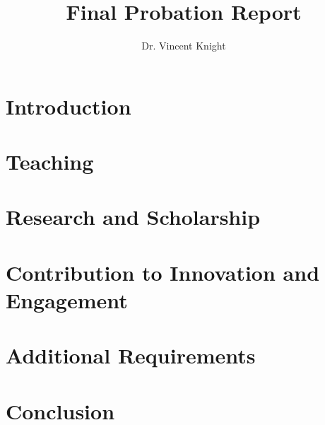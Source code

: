 \documentclass{article}
\title{Final Probation Report}
\author{Dr. Vincent Knight}
\begin{document}
\maketitle

\section{Introduction}\label{sec:introduction}
\section{Teaching}\label{sec:teaching}
\section{Research and Scholarship}\label{sec:research}
\section{Contribution to Innovation and Engagement}\label{sec:innovation}
\section{Additional Requirements}\label{sec:additional}
\section{Conclusion}\label{sec:conclusion}
\end{document}
